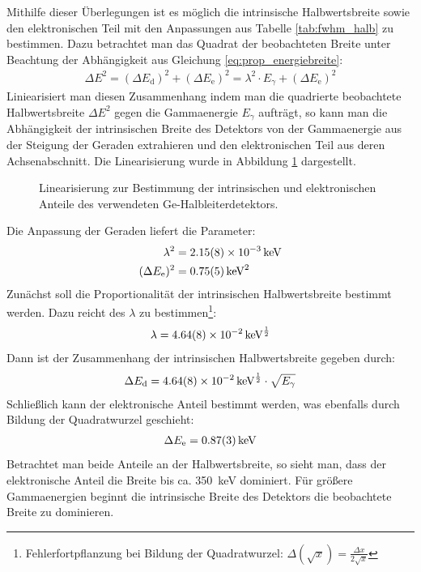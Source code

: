 \documentclass[11pt, a4paper]{article}
\numberwithin{equation}{section}
\begin{document}
Mithilfe dieser Überlegungen ist es möglich die intrinsische Halbwertsbreite sowie den elektronischen Teil mit den Anpassungen aus Tabelle \ref{tab:fwhm_halb} zu bestimmen.
Dazu betrachtet man das Quadrat der beobachteten Breite unter Beachtung der Abhängigkeit aus Gleichung \eqref{eq:prop_energiebreite}:
\begin{align}
	\Delta E^2 = (\Delta E_\mathrm{d})^2 + (\Delta E_\mathrm{e})^2 = \lambda^2 \cdot E_\gamma + (\Delta E_\mathrm{e})^2
\end{align}
Liniearisiert man diesen Zusammenhang indem man die quadrierte beobachtete Halbwertsbreite $\Delta E^2$ gegen die Gammaenergie $E_\gamma$ aufträgt, so kann man die Abhängigkeit der intrinsischen Breite des Detektors von der Gammaenergie aus der Steigung der Geraden extrahieren und den elektronischen Teil aus deren Achsenabschnitt.
Die Linearisierung wurde in Abbildung \ref{fig:lin_fwhm} dargestellt.
\begin{figure}[h]
	\centering
	
	\caption{Linearisierung zur Bestimmung der intrinsischen und elektronischen Anteile des verwendeten Ge-Halbleiterdetektors.}
	\label{fig:lin_fwhm}
\end{figure}
Die Anpassung der Geraden liefert die Parameter:
\begin{align*}
	\lambda^2 &= \SI{2.15 +- 0.08e-3}{\kilo\electronvolt}\\
	(\Delta E_\mathrm{e})^2 &= \SI{0.75 +- 0.05}{\kilo\electronvolt\squared}
\end{align*}
Zunächst soll die Proportionalität der intrinsischen Halbwertsbreite bestimmt werden.
Dazu reicht des $\lambda$ zu bestimmen\footnote{
Fehlerfortpflanzung bei Bildung der Quadratwurzel: $\Delta (\sqrt{x}) = \frac{\Delta x}{2 \sqrt{x}} $
}:
\begin{align*}
	\lambda = \SI{4.64 +-0.08e-2}{\kilo\electronvolt\tothe{\frac{1}{2}}}
\end{align*}
Dann ist der Zusammenhang der intrinsischen Halbwertsbreite gegeben durch:
\begin{align}
	\Delta E_\mathrm{d} = \SI{4.64 +-0.08e-2}{\kilo\electronvolt\tothe{\frac{1}{2}}} \cdot \sqrt{E_\gamma}
\end{align}
Schließlich kann der elektronische Anteil bestimmt werden, was ebenfalls durch Bildung der Quadratwurzel geschieht:
\begin{align}
	\Delta E_\mathrm{e} = \SI{0.87 +- 0.03}{\kilo\electronvolt}
\end{align}
Betrachtet man beide Anteile an der Halbwertsbreite, so sieht man, dass der elektronische Anteil die Breite bis ca. \SI{350}{\kilo\electronvolt} dominiert.
Für größere Gammaenergien beginnt die intrinsische Breite des Detektors die beobachtete Breite zu dominieren.
\end{document}
